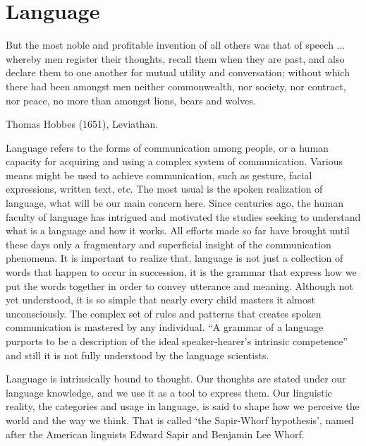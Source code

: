 \chapter{Language}
\epigraph{But the most noble and profitable invention of all others was that of speech ... whereby men register their thoughts, recall them when they are past, and also declare them to one another for mutual utility and conversation; without which there had been amongst men neither commonwealth, nor society, nor contract, nor peace, no more than amongst lions, bears and wolves.}{Thomas Hobbes (1651), Leviathan.}

Language refers to the forms of communication among people, or a human capacity for acquiring and using a complex system
of communication. Various means might be used to achieve communication, such as gesture, facial expressions, written text, etc.
The most usual is the spoken realization of language, what will be our main concern here.
Since centuries ago, the human faculty of language has intrigued and motivated the studies seeking to
understand what is a language and how it works.
All efforts made so far have brought until these days only a fragmentary and superficial 
insight of the communication phenomena. 
It is important to realize that, language is not just a collection of words that happen
to occur in succession, it is the grammar that express how we put the words together in
order to convey utterance and meaning. 
Although not yet understood, it is so simple that nearly every child 
masters it almost unconsciously.
The complex set of rules and patterns that creates spoken communication is
mastered by any individual.
``A grammar of a language purports to be a description of the ideal 
speaker-hearer's intrinsic competence'' \cite{chomsky1969}
and still it is not fully understood by the language scientists. 

Language is intrinsically bound to thought. Our thoughts are stated under our language knowledge, 
and we use it as a tool to express them. 
Our linguistic reality, the categories and usage in language, is said to shape how we perceive the world and the way we think. 
That is called `the Sapir-Whorf hypothesis', named after the American linguists Edward Sapir and Benjamin Lee Whorf. 

